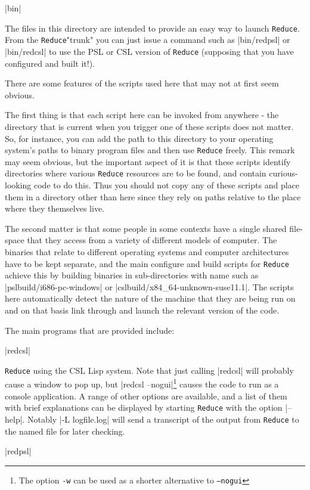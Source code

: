 \documentclass[12pt,twoside,openright]{memoir}
\newcommand{\reduce}{\texttt{Reduce}\xspace}
\begin{document}
\begin{description}
\item |bin|

  The files in this directory are intended to provide an easy way to launch
  \reduce. From the \reduce "trunk" you can just issue a command such as
  |bin/redpsl| or |bin/redcsl| to use the PSL or CSL version of \reduce
  (supposing that you have configured and built it!).

  There are some features of the scripts used here that may not at first seem
  obvious.

  The first thing is that each script here can be invoked from anywhere - the
  directory that is current when you trigger one of these scripts does not
  matter. So, for instance, you can add the path to this directory to your
  operating system's paths to binary program files and then use \reduce
  freely. This remark may seem obvious, but the important aspect of it is that
  these scripts identify directories where various \reduce resources are to be
  found, and contain curious-looking code to do this. Thus you should not
  copy any of these scripts and place them in a directory other than here since
  they rely on paths relative to the place where they themselves live.

  The second matter is that some people in some contexts have a single shared
  file-space that they access from a variety of different models of computer.
  The binaries that relate to different operating systems and computer
  architectures have to be kept separate, and the main configure and build
  scripts for \reduce achieve this by building binaries in sub-directories with
  name such as |pslbuild/i686-pc-windows| or |cslbuild/x84_64-unknown-suse11.1|.
  The scripts here automatically detect the nature of the machine that they are
  being run on and on that basis link through and launch the relevant version
  of the code.

  The main programs that are provided include:
  \begin{description}
  \item |redcsl|

    \reduce using the CSL Lisp system. Note that just calling |redcsl|
    will probably cause a window to pop up, but
|redcsl --nogui|\footnote{The option \texttt{-w} can be used as a shorter
alternative to \texttt{--nogui}} causes the code to run as a console
application. A range of other options are available, and a list of them
with brief explanations can be displayed by starting \reduce with the
option |--help|. Notably |-L logfile.log| will send a transcript of the
output from \reduce to the named file for later checking.
  \item |redpsl|


\end{description}
\end{description}
\end{document}
